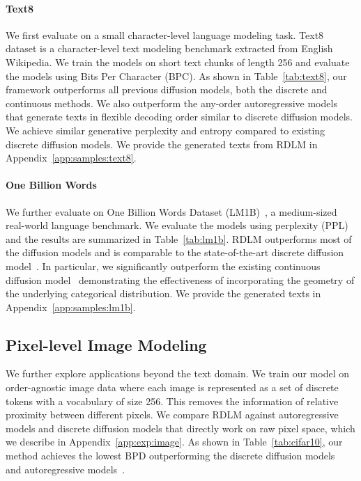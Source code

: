 \paragraph{Text8}
We first evaluate on a small character-level language modeling task. 
Text8~\citep{data_text8} dataset is a character-level text modeling benchmark extracted from English Wikipedia.
We train the models on short text chunks of length 256
and evaluate the models using Bits Per Character (BPC).
As shown in Table~\ref{tab:text8}, our framework outperforms all previous diffusion models, both the discrete and continuous methods.
We also outperform the any-order autoregressive models that generate texts in flexible decoding order similar to discrete diffusion models.
We achieve similar generative perplexity and entropy compared to existing discrete diffusion models. 
We provide the generated texts from RDLM in Appendix~\ref{app:samples:text8}.


\paragraph{One Billion Words}
We further evaluate on One Billion Words Dataset (LM1B)~\citep{chelba2013one}, a medium-sized real-world language benchmark. 
We evaluate the models using perplexity (PPL) and the results are summarized in Table~\ref{tab:lm1b}. 
RDLM outperforms most of the diffusion models and is comparable to the state-of-the-art discrete diffusion model~\citep{shi2024md4}. 
In particular, we significantly outperform the existing continuous diffusion model~\citep{li2022diffusion} demonstrating the effectiveness of incorporating the geometry of the underlying categorical distribution.
We provide the generated texts in Appendix~\ref{app:samples:lm1b}.







\subsection{Pixel-level Image Modeling}
We further explore applications beyond the text domain. 
We train our model on order-agnostic image data where each image is represented as a set of discrete tokens with a vocabulary of size 256. 
This removes the information of relative proximity between different pixels. 
We compare RDLM against autoregressive models and discrete diffusion models that directly work on raw pixel space, which we describe in Appendix~\ref{app:exp:image}.
As shown in Table~\ref{tab:cifar10}, our method achieves the lowest BPD outperforming the discrete diffusion models~\citep{austin2021d3pm,shi2024md4} and autoregressive models~\citep{chen2018pixelsnail,child2019sparse}.



